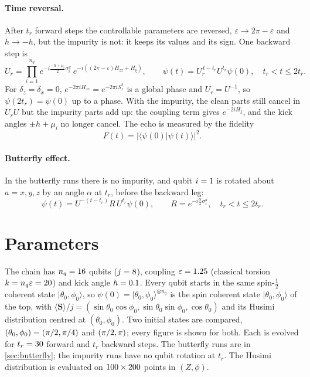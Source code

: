\documentclass[11pt,a4paper]{article}
\begin{document}
\paragraph{Time reversal.}
After $t_r$ forward steps the controllable parameters are reversed, $\varepsilon\to2\pi-\varepsilon$ and $h\to-h$, but
the impurity is not: it keeps its values and its sign. One backward step is
\begin{equation}\label{eq:Ub}
  U_r = \prod_{i=1}^{n_q} e^{-i\frac{-h+\mu_i}{2}\sigma^x_i}\,e^{-i((2\pi-\varepsilon)H_{zz}+H_\xi)},
  \qquad \psi(t) = U_r^{\,t-t_r}U^{t_r}\psi(0),\quad t_r<t\le2t_r .
\end{equation}
For $\delta_z=\delta_x=0$, $e^{-2\pi iH_{zz}}=e^{-2\pi iS_z^2}$ is a global phase and $U_r=U^{-1}$, so
$\psi(2t_r)=\psi(0)$ up to a phase. With the impurity, the clean parts still cancel in $U_rU$ but the impurity
parts add up: the coupling term gives $e^{-2iH_\xi}$, and the kick angles $\pm h+\mu_i$ no longer cancel.
The echo is measured by the fidelity
\begin{equation}\label{eq:F}
  F(t) = |\langle\psi(0)|\psi(t)\rangle|^2 .
\end{equation}

\paragraph{Butterfly effect.}
In the butterfly runs there is no impurity, and qubit $i=1$ is rotated about $a=x,y,z$ by an angle $\alpha$ at
$t_r$, before the backward leg:
\begin{equation}\label{eq:bf}
  \psi(t) = U^{-(t-t_r)}R\,U^{t_r}\psi(0),\qquad R=e^{-i\frac\alpha2\sigma^a_i},\quad t_r<t\le2t_r .
\end{equation}

\section{Parameters}\label{sec:parameters}

The chain has $n_q=16$ qubits ($j=8$), coupling $\varepsilon=1.25$ (classical torsion $k=n_q\varepsilon=20$)
and kick angle $h=0.1$. Every qubit starts in the same spin-$\frac12$ coherent state $|\theta_0,\phi_0\rangle$, so
$\psi(0)=|\theta_0,\phi_0\rangle^{\otimes n_q}$ is the spin coherent state $|\theta_0,\phi_0\rangle$ of the top, with
$\langle\bm S\rangle/j=(\sin\theta_0\cos\phi_0,\sin\theta_0\sin\phi_0,\cos\theta_0)$ and its Husimi distribution
centred at $(\theta_0,\phi_0)$. Two initial states are compared, $(\theta_0,\phi_0)=(\pi/2,\pi/4)$ and
$(\pi/2,\pi)$; every figure is shown for both. Each is evolved for
$t_r=30$ forward and $t_r$ backward steps. The butterfly runs are in \cref{sec:butterfly}; the impurity runs
have no qubit rotation at $t_r$. The Husimi distribution is evaluated on $100\times200$ points in $(Z,\phi)$.
\end{document}

